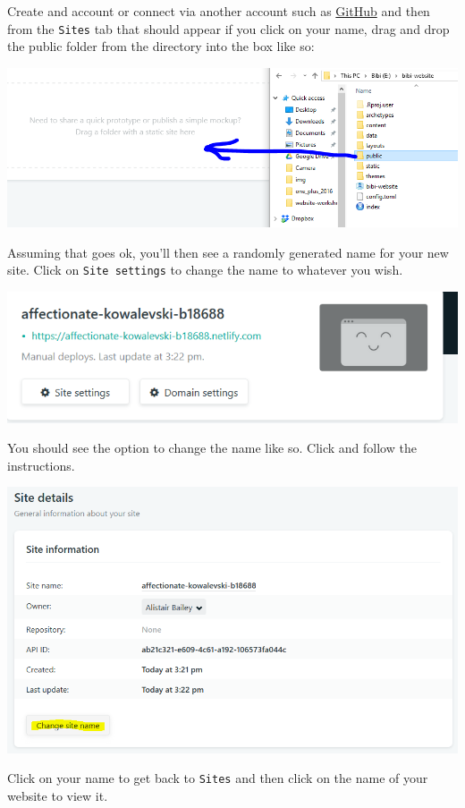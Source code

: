\documentclass[12pt,]{book}
\theoremstyle{definition}
\theoremstyle{definition}
\theoremstyle{definition}
\theoremstyle{remark}
\begin{document}
Create and account or connect via another account such as
\href{https://github.com/}{GitHub} and then from the \texttt{Sites} tab
that should appear if you click on your name, drag and drop the public
folder from the directory into the box like so:

\includegraphics[width=1.2\linewidth]{img/netlify-drag-public}

Assuming that goes ok, you'll then see a randomly generated name for
your new site. Click on \texttt{Site\ settings} to change the name to
whatever you wish.

\includegraphics[width=1.2\linewidth]{img/netlify-random-sitename}

You should see the option to change the name like so. Click and follow
the instructions.

\includegraphics[width=1.2\linewidth]{img/netlify-change-sitename}

Click on your name to get back to \texttt{Sites} and then click on the
name of your website to view it.
\end{document}
